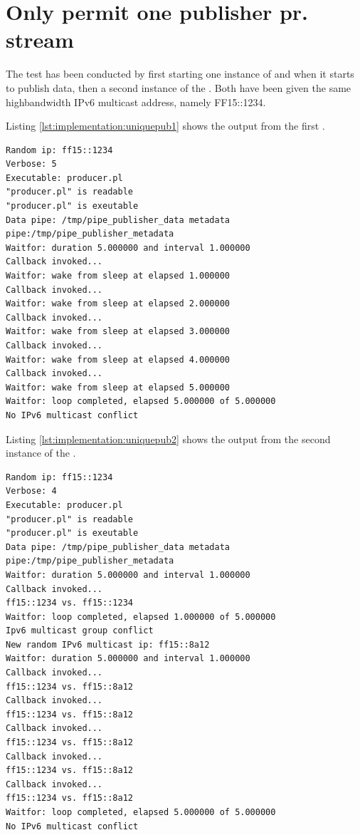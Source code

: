 \section{Only permit one publisher pr. stream}

The test has been conducted by first starting one instance of  and when it starts to publish data, then a second instance of the . Both  have been given the same highbandwidth IPv6 multicast address, namely FF15::1234.

Listing \ref{lst:implementation:uniquepub1} shows the output from the first .

\begin{lstlisting}
Random ip: ff15::1234
Verbose: 5
Executable: producer.pl
"producer.pl" is readable
"producer.pl" is exeutable
Data pipe: /tmp/pipe_publisher_data metadata pipe:/tmp/pipe_publisher_metadata
Waitfor: duration 5.000000 and interval 1.000000
Callback invoked...
Waitfor: wake from sleep at elapsed 1.000000
Callback invoked...
Waitfor: wake from sleep at elapsed 2.000000
Callback invoked...
Waitfor: wake from sleep at elapsed 3.000000
Callback invoked...
Waitfor: wake from sleep at elapsed 4.000000
Callback invoked...
Waitfor: wake from sleep at elapsed 5.000000
Waitfor: loop completed, elapsed 5.000000 of 5.000000
No IPv6 multicast conflict
\end{lstlisting} \label{lst:implementation:uniquepub1}

Listing \ref{lst:implementation:uniquepub2} shows the output from the second instance of the .

\begin{lstlisting}
Random ip: ff15::1234
Verbose: 4
Executable: producer.pl
"producer.pl" is readable
"producer.pl" is exeutable
Data pipe: /tmp/pipe_publisher_data metadata pipe:/tmp/pipe_publisher_metadata
Waitfor: duration 5.000000 and interval 1.000000
Callback invoked...
ff15::1234 vs. ff15::1234
Waitfor: loop completed, elapsed 1.000000 of 5.000000
Ipv6 multicast group conflict
New random IPv6 multicast ip: ff15::8a12
Waitfor: duration 5.000000 and interval 1.000000
Callback invoked...
ff15::1234 vs. ff15::8a12
Callback invoked...
ff15::1234 vs. ff15::8a12
Callback invoked...
ff15::1234 vs. ff15::8a12
Callback invoked...
ff15::1234 vs. ff15::8a12
Callback invoked...
ff15::1234 vs. ff15::8a12
Waitfor: loop completed, elapsed 5.000000 of 5.000000
No IPv6 multicast conflict
\end{lstlisting}\label{lst:implementation:uniquepub2}




